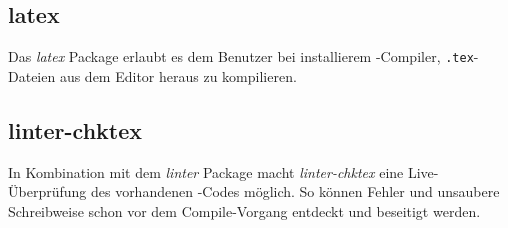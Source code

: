         \subsection{latex}
            Das \textit{latex} Package erlaubt es dem Benutzer bei installierem \latex-Compiler, \texttt{.tex}-Dateien aus dem Editor heraus zu kompilieren.
        \subsection{linter-chktex}
            In Kombination mit dem \textit{linter} Package macht \textit{linter-chktex} eine Live-Überprüfung des vorhandenen \latex-Codes möglich. So können Fehler und unsaubere Schreibweise schon vor dem Compile-Vorgang entdeckt und beseitigt werden.
